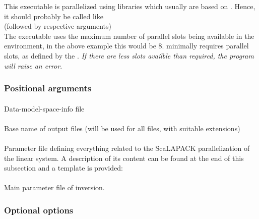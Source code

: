 This executable is parallelized using  libraries which usually are based on . 
Hence, it should probably be called like\\
 (followed by respective arguments)\\
The executable uses the maximum number of parallel slots being available in the  environment, in 
the above example this would be 8.  minimally requires  parallel
slots, as defined by the . \emph{If there are less slots availble than required, the program will 
raise an error}.
\subsubsection{Positional arguments}
\paragraph{}
Data-model-space-info file
\paragraph{}
Base name of output files (will be used for all files, with suitable extensions)
\paragraph{}
Parameter file defining everything related to the ScaLAPACK parallelization of the linear system.
A description of its content can be found at the end of this subsection and a template is provided:\\
\paragraph{}
Main parameter file of inversion.
\subsubsection{Optional options}

